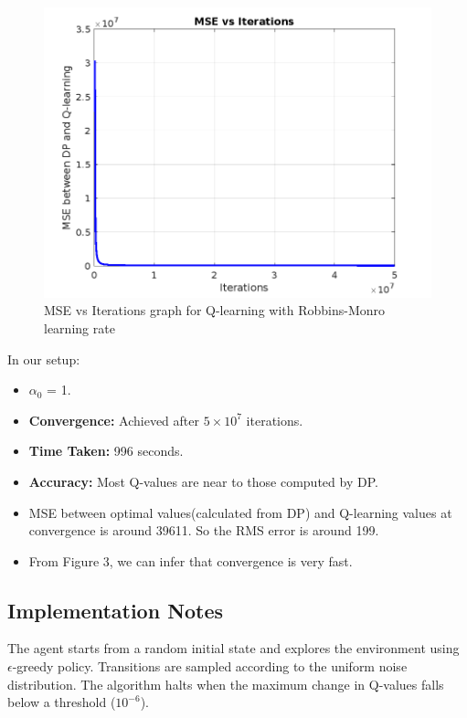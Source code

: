 \documentclass[10pt,twocolumn,letterpaper]{article}
\begin{document}
\begin{figure}
    \centering
    \includegraphics[width=1\linewidth]{MSE_vs_Iterations.png}
    \caption{MSE vs Iterations graph for Q-learning with Robbins-Monro learning rate}
    \label{fig:enter-label}
\end{figure}
In our setup:
\begin{itemize}
    \item $\alpha_0$ = 1.
    \item \textbf{Convergence:} Achieved after $5 \times 10^7$ iterations.
    \item \textbf{Time Taken:} 996 seconds.
    \item \textbf{Accuracy:} Most Q-values are near to those computed by DP.
    \item MSE between optimal values(calculated from DP) and Q-learning values at convergence is around 39611. So the RMS error is around 199.
    \item From Figure 3, we can infer that convergence is very fast.
\end{itemize}

\subsection*{Implementation Notes}

The agent starts from a random initial state and explores the environment using $\epsilon$-greedy policy. Transitions are sampled according to the uniform noise distribution. The algorithm halts when the maximum change in Q-values falls below a threshold ($10^{-6}$).
\end{document}
